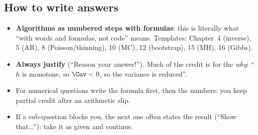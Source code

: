 \subsection{How to write answers}
\begin{itemize}
  \item \textbf{Algorithms as numbered steps with formulas}: this is literally what ``with words and formulas, not code'' means. Templates: Chapter~4 (inverse), 5 (AR), 8 (Poisson/thinning), 10 (MC), 12 (bootstrap), 15 (MH), 16 (Gibbs).
  \item \textbf{Always justify} (``Reason your answer!''). Much of the credit is for the \emph{why}: ``$h$ is monotone, so $\Cov<0$, so the variance is reduced''.
  \item For numerical questions write the formula first, then the numbers: you keep partial credit after an arithmetic slip.
  \item If a sub-question blocks you, the next one often states the result (``Show that\ldots''): take it as given and continue.
\end{itemize}

